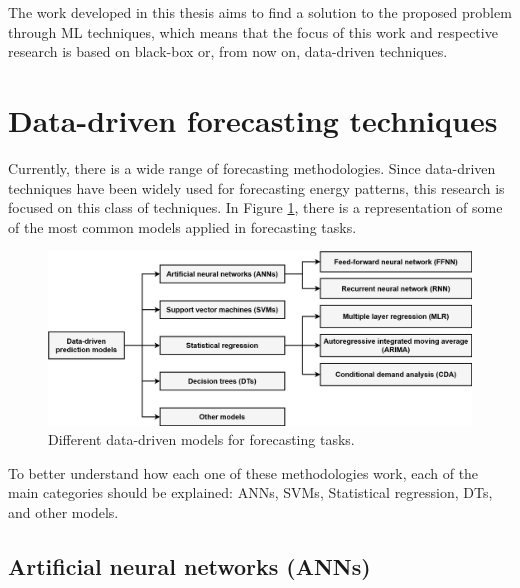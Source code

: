 The work developed in this thesis aims to find a solution to the proposed problem through \ac{ML} techniques, which means that the focus of this work and respective research is based on black-box or, from now on, data-driven techniques.

\section{Data-driven forecasting techniques\label{b}}

Currently, there is a wide range of forecasting methodologies. Since data-driven techniques have been widely used for forecasting energy patterns, this research is focused on this class of techniques. In Figure \ref{datamodels}, there is a representation of some of the most common models applied in forecasting tasks.

\begin{figure}[h!]
    \centering
    \begin{center}
    \includegraphics[width=1\textwidth]{Images/data-drive prediction models.png}
    \caption{Different data-driven models for forecasting tasks.}
    \label{datamodels}
    \end{center}
\end{figure}

To better understand how each one of these methodologies work, each of the main categories should be explained: \acf{ANNs}, \acf{SVMs}, Statistical regression, \acf{DTs}, and other models.


\subsection{Artificial neural networks (ANNs)}

